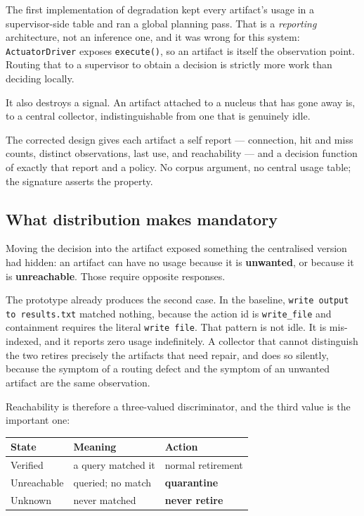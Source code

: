 \documentclass[11pt,twocolumn]{article}
\begin{document}
The first implementation of degradation kept every artifact's usage in a
supervisor-side table and ran a global planning pass. That is a
\emph{reporting} architecture, not an inference one, and it was wrong for this
system: \texttt{ActuatorDriver} exposes \texttt{execute()}, so an artifact is
itself the observation point. Routing that to a supervisor to obtain a decision
is strictly more work than deciding locally.

It also destroys a signal. An artifact attached to a nucleus that has gone away
is, to a central collector, indistinguishable from one that is genuinely idle.

The corrected design gives each artifact a self report --- connection, hit and
miss counts, distinct observations, last use, and reachability --- and a
decision function of exactly that report and a policy. No corpus argument, no
central usage table; the signature asserts the property.

\subsection{What distribution makes mandatory}

Moving the decision into the artifact exposed something the centralised version
had hidden: an artifact can have no usage because it is \textbf{unwanted}, or
because it is \textbf{unreachable}. Those require opposite responses.

The prototype already produces the second case. In the baseline,
\texttt{write output to results.txt} matched nothing, because the action id is
\texttt{write\_file} and containment requires the literal \texttt{write file}.
That pattern is not idle. It is mis-indexed, and it reports zero usage
indefinitely. A collector that cannot distinguish the two retires precisely the
artifacts that need repair, and does so silently, because the symptom of a
routing defect and the symptom of an unwanted artifact are the same observation.

Reachability is therefore a three-valued discriminator, and the third value is
the important one:

\begin{center}
\small
\begin{tabular}{@{}lll@{}}
\toprule
\textbf{State} & \textbf{Meaning} & \textbf{Action} \\
\midrule
Verified    & a query matched it & normal retirement \\
Unreachable & queried; no match & \textbf{quarantine} \\
Unknown     & never matched & \textbf{never retire} \\
\bottomrule
\end{tabular}
\normalsize
\end{center}
\end{document}

